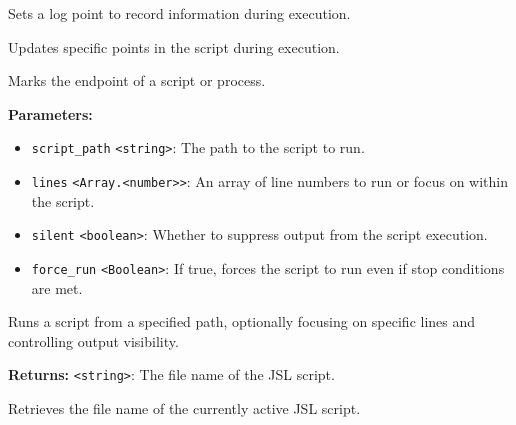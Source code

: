 \documentclass[12pt,a4paper]{article}
\begin{document}
\noindent Sets a log point to record information during execution.

\vspace{5mm}
\noindent {}


\noindent Updates specific points in the script during execution.

\vspace{5mm}
\noindent {}


\noindent Marks the endpoint of a script or process.

\vspace{5mm}
\noindent {}


\noindent \textbf{Parameters:}
\begin{itemize}
  \item \texttt{script\_path} \texttt{<string>}: The path to the script to run.
  \item \texttt{lines} \texttt{<Array.<number>>}: An array of line numbers to run or focus on within the script.
  \item \texttt{silent} \texttt{<boolean>}: Whether to suppress output from the script execution.
  \item \texttt{force\_run} \texttt{<Boolean>}: If true, forces the script to run even if stop conditions are met.
\end{itemize}

\noindent Runs a script from a specified path, optionally focusing on specific lines and controlling output visibility.

\vspace{5mm}
\noindent {}


\noindent \textbf{Returns:} \texttt{<string>}: The file name of the JSL script.

\noindent Retrieves the file name of the currently active JSL script.

\vspace{5mm}
\noindent {}
\end{document}
